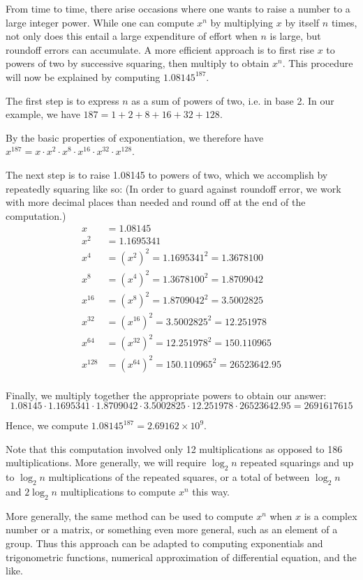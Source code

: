 \documentclass[12pt]{article}
\begin{document}
From time to time, there arise occasions where one wants to raise a
number to a large integer power.  While one can compute $x^n$ by
multiplying $x$ by itself $n$ times, not only does this entail a
large expenditure of effort when $n$ is large, but roundoff errors
can accumulate.  A more efficient approach is to first rise $x$ to
powers of two by successive squaring, then multiply to obtain $x^n$.
This procedure will now be explained by computing $1.08145^{187}$.

The first step is to express $n$ as a sum of powers of two, i.e. in
base 2.  In our example, we have $187 = 1 + 2 + 8 + 16 + 32 + 128$.

By the basic properties of exponentiation, we therefore have
$x^{187} = x \cdot x^2 \cdot x^8 \cdot x^{16} \cdot x^{32} \cdot x^{128}$.

The next step is to raise 1.08145 to powers of two, which we accomplish
by repeatedly squaring like so:  (In order to guard against roundoff
error, we work with more decimal places than needed and round off at the 
end of the computation.)
\begin{align*}
x &= 1.08145 \\
x^2 &= 1.1695341 \\
x^4 &= (x^2)^2 = 1.1695341^2 = 1.3678100 \\
x^8 &= (x^4)^2 = 1.3678100^2 = 1.8709042 \\
x^{16} &= (x^8)^2 = 1.8709042^2 = 3.5002825 \\
x^{32} &= (x^{16})^2 = 3.5002825^2 = 12.251978\\
x^{64} &= (x^{32})^2 = 12.251978^2 = 150.110965\\
x^{128} &= (x^{64})^2 = 150.110965^2 = 26523642.95\\
\end{align*}

Finally, we multiply together the appropriate powers to obtain our
answer:
\[
 1.08145 \cdot 1.1695341 \cdot 1.8709042 \cdot 3.5002825 \cdot
 12.251978 \cdot 26523642.95 = 2691617615
\]

Hence, we compute $1.08145^{187} = 2.69162 \times 10^9$.

Note that this computation involved only 12 multiplications
as opposed to 186 multiplications.   More generally, we will
require $\log_2 n$ repeated squarings and up to $\log_2 n$
multiplications of the repeated squares, or a total of between
$\log_2 n$ and $2 \log_2 n$ multiplications to compute
$x^n$ this way.

More generally, the same method can be used to compute $x^n$
when $x$ is a complex number or a matrix, or something even
more general, such as an element of a group.  Thus this
approach can be adapted to computing exponentials and 
trigonometric functions, numerical approximation of differential
equation, and the like.

\end{document}
